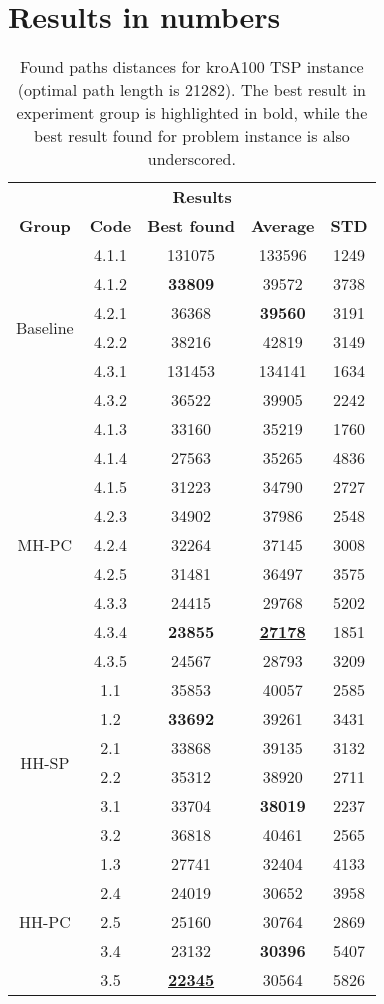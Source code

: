 \section{Results in numbers}\label{app:eval:1:tables}
\begin{table}[!htbp]
	\begin{tabular}{cc|ccc}
		\hline
		\rowcolor{gray!20}
		\multicolumn{2}{c|}{\textbf{Solver}} & \multicolumn{3}{c}{\textbf{Results}} \\
		\rowcolor{gray!20}
		\textbf{Group} & \textbf{Code} & \textbf{Best found} & \textbf{Average} & \textbf{STD} \\
		\hline
		\multirow{6}{*}{Baseline} 
		& 4.1.1 & 131075 & 133596 & 1249 \\
		& 4.1.2 & \textbf{33809} & 39572 & 3738 \\
		& 4.2.1 & 36368 & \textbf{39560} & 3191 \\
		& 4.2.2 & 38216 & 42819 & 3149 \\
		& 4.3.1 & 131453 & 134141 & 1634 \\
		& 4.3.2 & 36522 & 39905 & 2242 \\
		\hline
		\multirow{9}{*}{MH-PC} 
		& 4.1.3 & 33160 & 35219 & 1760 \\
		& 4.1.4 & 27563 & 35265 & 4836 \\
		& 4.1.5 & 31223 & 34790 & 2727 \\
		& 4.2.3 & 34902 & 37986 & 2548 \\
		& 4.2.4 & 32264 & 37145 & 3008 \\
		& 4.2.5 & 31481 & 36497 & 3575 \\
		& 4.3.3 & 24415 & 29768 & 5202 \\
		& 4.3.4 & \textbf{23855} & \textbf{\underline{27178}} & 1851 \\
		& 4.3.5 & 24567 & 28793 & 3209 \\
		\hline
		\multirow{6}{*}{HH-SP} 
		& 1.1 & 35853 & 40057 & 2585 \\
		& 1.2 & \textbf{33692} & 39261 & 3431 \\
		& 2.1 & 33868 & 39135 & 3132 \\
		& 2.2 & 35312 & 38920 & 2711 \\
		& 3.1 & 33704 & \textbf{38019} & 2237 \\
		& 3.2 & 36818 & 40461 & 2565 \\
		\hline
		\multirow{5}{*}{HH-PC} 
		& 1.3 & 27741 & 32404 & 4133 \\
		& 2.4 & 24019 & 30652 & 3958 \\
		& 2.5 & 25160 & 30764 & 2869 \\
		& 3.4 & 23132 & \textbf{30396} & 5407 \\
		& 3.5 & \textbf{\underline{22345}} & 30564 & 5826 \\
		\hline
	\end{tabular}
	\caption{Found paths distances for kroA100 TSP instance (optimal path length is 21282). The best result in experiment group is highlighted in bold, while the best result found for problem instance is also underscored.}
\end{table}

